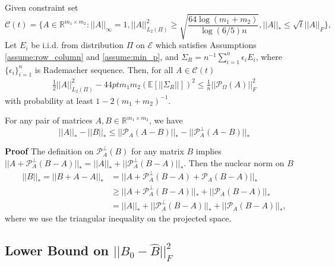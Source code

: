 \documentclass{article} %
\newcommand\mc{\mathcal} %
\begin{document}
\begin{lemma} \label{lmm:constraintset} Given constraint set
\begin{equation}
\mc{C}(t) = \bigg\{ A \in \mathbb{R}^{m_1 \times m_2}: ||A||_\infty = 1, ||A||_{L_2(\Pi)}^2 \geq \sqrt{\frac{64\log(m_1+m_2)}{\log(6/5)n}}, ||A||_* \leq \sqrt{t}||A||_F \bigg\},
\end{equation}
Let $E_i$ be i.i.d. from distribution $\Pi$ on $\mc{E}$ which satisfies Assumptions \ref{assume:row_column} and \ref{assume:min_p}, and $\Sigma_R = n^{-1}\sum_{i=1}^{n}\epsilon_i E_i$, where $\{\epsilon_i\}_{i=1}^{n}$ is Rademacher sequence. Then, for all $A\in \mc{C}(t)$
\begin{align}
\frac{1}{2}||A||_{L_2(\Pi)}^2  - 44 ptm_1m_2(\mathbb{E}[||\Sigma_R||])^2 \leq \frac{1}{n}||\mc{P}_{\Omega}(A)||_F^2
\end{align}
with probability at least $1-2(m_1+m_2)^{-1}$.
\end{lemma}

\begin{lemma}\label{lmm:normdiff}For any pair of matrices $A, B \in \mathbb{R}^{m_1 \times m_2}$, we have
\begin{equation}
||A||_* - ||B||_* \leq ||\mc{P}_A(A-B)||_* - ||\mc{P}_A^\perp(A-B)||_*
\end{equation}
\end{lemma}
\textbf{Proof} The definition on $\mc{P}_A^\perp(B)$ for any matrix $B$ implies $||A + \mc{P}_A^\perp(B-A)||_* = ||A||_* + ||\mc{P}_A^\perp(B-A)||_*$. Then the nuclear norm on $B$
\begin{align}
||B||_* = ||B + A - A||_* &= ||A + \mc{P}^\perp_A(B-A) + \mc{P}_A(B-A)||_*\\
&\geq ||A + \mc{P}^\perp_A(B-A)||_* + ||\mc{P}_A(B-A)||_*\\
&= ||A||_* + ||\mc{P}^\perp_A(B-A)||_* + ||\mc{P}_A(B-A)||_*,
\end{align}
where we use the triangular inequality on the projected space.


\subsection{Lower Bound on $||B_0-\hat{B}||_F^2$}
\end{document}
